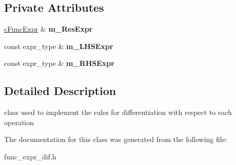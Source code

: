\subsection*{Private Attributes}
\begin{DoxyCompactItemize}
\item 
\hypertarget{classcExprDiffVisitor_a7d8cba6d4c5d61a91ccf7fdd7e9a820c}{\hyperlink{classcFuncExpr}{c\-Func\-Expr} \& {\bfseries m\-\_\-\-Res\-Expr}}\label{classcExprDiffVisitor_a7d8cba6d4c5d61a91ccf7fdd7e9a820c}

\item 
\hypertarget{classcExprDiffVisitor_aceac3de17c7fe94985bef8534a4b8fb2}{const expr\-\_\-type \& {\bfseries m\-\_\-\-L\-H\-S\-Expr}}\label{classcExprDiffVisitor_aceac3de17c7fe94985bef8534a4b8fb2}

\item 
\hypertarget{classcExprDiffVisitor_a32d17ecf34d93a58e7f6e066f785405b}{const expr\-\_\-type \& {\bfseries m\-\_\-\-R\-H\-S\-Expr}}\label{classcExprDiffVisitor_a32d17ecf34d93a58e7f6e066f785405b}

\end{DoxyCompactItemize}


\subsection{Detailed Description}
class used to implement the rules for differentiation with respect to each operation 

The documentation for this class was generated from the following file\-:\begin{DoxyCompactItemize}
\item 
func\-\_\-expr\-\_\-dif.\-h\end{DoxyCompactItemize}

